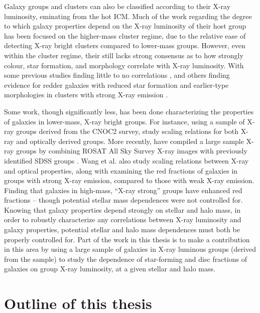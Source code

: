 Galaxy groups and clusters can also be classified according to their
X-ray luminosity, eminating from the hot ICM.  Much of the work
regarding the degree to which galaxy properties depend on the X-ray
luminosity of their host group has been focused on the higher-mass
cluster regime, due to the relative ease of detecting X-ray bright
clusters compared to lower-mass groups.  However, even within the
cluster regime, their still lacks strong consensus as to how strongly
colour, star formation, and morphology correlate with X-ray luminosity.  With
some previous studies finding little to no correlations
\citep{ellingson2001, balogh2002a, fairley2002, wake2005,
  lopes2014}, and others finding evidence for redder
galaxies with reduced star formation and earlier-type morphologies in
clusters with strong X-ray emission \citep{balogh2002b, postman2005,
  urquhart2010}.
\par
Some work, though significantly less, has been done characterizing the
properties of galaxies in lower-mass, X-ray bright groups.  For
instance, \citet{connelly2012} using a sample of X-ray groups derived
from the CNOC2 survey, study scaling relations for both X-ray and
optically derived groups.  More recently, \citet{wang2014} have
compiled a large sample X-ray groups by combining ROSAT All Sky Survey
X-ray images with previously identified SDSS groups \citep{yang2005,
  yang2007}.  Wang et al. also study scaling relations between X-ray
and optical properties, along with examining the red fractions of
galaxies in groups with strong X-ray emission, compared to those with
weak X-ray emission.  Finding that galaxies in high-mass, ``X-ray
strong'' groups have enhanced red fractions -- though potential
stellar mass dependences were not controlled for.  Knowing that galaxy
properties depend strongly on stellar and halo mass, in order to
robustly characterize any correlations between X-ray luminosity and
galaxy properties, potential stellar and halo mass dependences must
both be properly controlled for.  Part of the work in this thesis
is to make a contribution in this area by using a large sample of
galaxies in X-ray luminous groups (derived from the \citealt{wang2014}
sample) to study the dependence of star-forming and disc fractions of
galaxies on group X-ray luminosity, at a given stellar and halo mass.

\section{Outline of this thesis}
\label{sec:outline}

